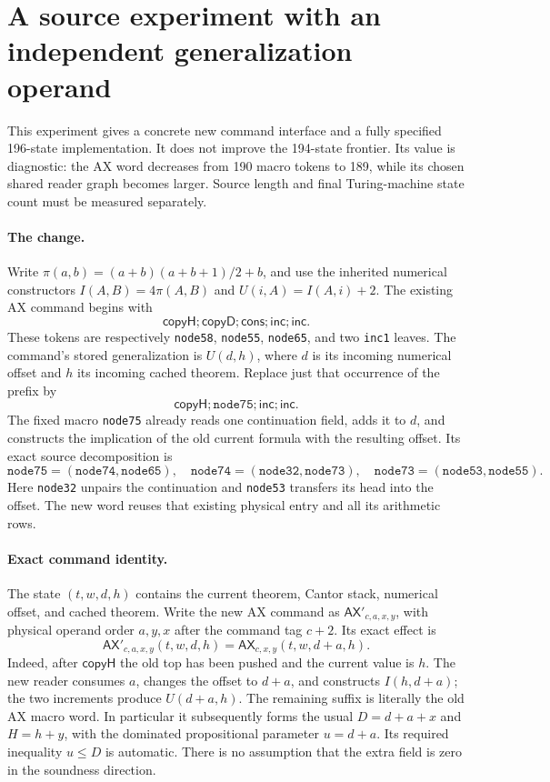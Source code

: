\section{A source experiment with an independent generalization operand}
\label{sec:parameterized-generalizer}

This experiment gives a concrete new command interface and a fully specified
196-state implementation.  It does not improve the 194-state frontier.
Its value is diagnostic: the AX word decreases from 190 macro tokens to
189, while its chosen shared reader graph becomes larger.  Source length
and final Turing-machine state count must be measured separately.

\paragraph{The change.}
Write \(\pi(a,b)=(a+b)(a+b+1)/2+b\), and use the inherited numerical
constructors \(I(A,B)=4\pi(A,B)\) and \(U(i,A)=I(A,i)+2\).
The existing AX command begins with
\[
  \mathsf{copyH};\mathsf{copyD};\mathsf{cons};\mathsf{inc};
  \mathsf{inc}.
\]
These tokens are respectively \texttt{node58}, \texttt{node55},
\texttt{node65}, and two \texttt{inc1} leaves.  The command's stored
generalization is \(U(d,h)\), where \(d\) is its incoming numerical offset
and \(h\) its incoming cached theorem.  Replace just that occurrence of
the prefix by
\[
  \mathsf{copyH};\texttt{node75};\mathsf{inc};\mathsf{inc}.
\]
The fixed macro \texttt{node75} already reads one continuation field,
adds it to \(d\), and constructs the implication of the old current
formula with the resulting offset.  Its exact source decomposition is
\[
 \texttt{node75}
  =(\texttt{node74},\texttt{node65}),\quad
 \texttt{node74}=(\texttt{node32},\texttt{node73}),\quad
 \texttt{node73}=(\texttt{node53},\texttt{node55}).
\]
Here \texttt{node32} unpairs the continuation and \texttt{node53}
transfers its head into the offset.  The new word reuses that existing
physical entry and all its arithmetic rows.

\paragraph{Exact command identity.}
The state \((t,w,d,h)\) contains the current theorem, Cantor stack,
numerical offset, and cached theorem.  Write the new AX command as
\(\mathsf{AX}'_{c,a,x,y}\), with physical operand order \(a,y,x\) after
the command tag \(c+2\).  Its exact effect is
\[
 \boxed{\quad
 \mathsf{AX}'_{c,a,x,y}(t,w,d,h)
   =\mathsf{AX}_{c,x,y}(t,w,d+a,h).
 \quad}
\]
Indeed, after \(\mathsf{copyH}\) the old top has been pushed and the
current value is \(h\).  The new reader consumes \(a\), changes the
offset to \(d+a\), and constructs \(I(h,d+a)\); the two increments
produce \(U(d+a,h)\).  The remaining suffix is literally the old AX
macro word.  In particular it subsequently forms the usual
\(D=d+a+x\) and \(H=h+y\), with the dominated propositional parameter
\(u=d+a\).  Its required inequality \(u\leq D\) is automatic.
There is no assumption that the extra field is zero in the soundness
direction.

